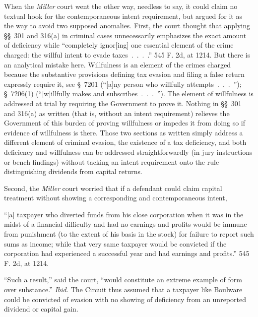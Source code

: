  When the \emph{Miller} court went the other way, needless to say, it
could claim no textual hook for the contemporaneous intent requirement,
but argued for it as the way to avoid two supposed anomalies. First,
the court thought that applying \S\S~301 and 316(a) in criminal
cases unnecessarily emphasizes the exact amount of deficiency while
``completely ignor[ing] one essential element of the crime charged:
the willful intent to evade taxes~.~.~.~.'' 545 F. 2d, at
1214. But there is an analytical mistake here. Willfulness is an
element of the crimes charged because the substantive provisions
defining tax evasion and filing a false return expressly require it,
see \S~7201 (``[a]ny person who willfully attempts~.~.~.~'');
\S~7206(1) (``[w]illfully makes and subscribes~.~.~.~'').
The element of willfulness is addressed at trial by requiring the
Government to prove it. Nothing in \S\S~301 and 316(a) as written (that
is, without an intent requirement) relieves the Government of this
burden of proving willfulness or impedes it from doing \newpage  so if
evidence of willfulness is there. Those two sections as written simply
address a different element of criminal evasion, the existence of a
tax deficiency, and both deficiency and willfulness can be addressed
straightforwardly (in jury instructions or bench findings) without
tacking an intent requirement onto the rule distinguishing dividends
from capital returns.

  Second, the \emph{Miller} court worried that if a defendant could claim
capital treatment without showing a corresponding and contemporaneous
intent,

    ``[a] taxpayer who diverted funds from his close corporation when
    it was in the midst of a financial difficulty and had no earnings
    and profits would be immune from punishment (to the extent of his
    basis in the stock) for failure to report such sums as income; while
    that very same taxpayer would be convicted if the corporation had
    experienced a successful year and had earnings and profits.'' 545
    F. 2d, at 1214.

``Such a result,'' said the court, ``would constitute an extreme
example of form over substance.'' \emph{Ibid.} The Circuit thus
assumed that a taxpayer like Boulware could be convicted of evasion with
no showing of deficiency from an unreported dividend or capital gain.

